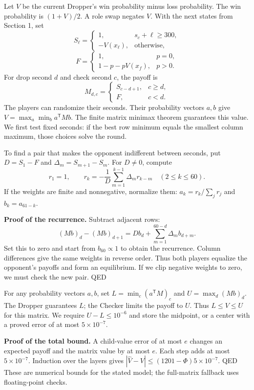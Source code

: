\documentclass[10pt]{article}
\newcommand{\head}[1]{\par\vspace{5pt}{\large\bfseries #1}\par\vspace{2pt}}
\begin{document}
\begin{minipage}[t]{0.505\textwidth}
\vspace{0pt}
\head{4. Calculate both players' strategies}
Let $V$ be the current Dropper's win probability minus loss probability.
The win probability is $(1+V)/2$. A role swap negates $V$. With the next states from Section 1, set
\[
S_\ell=\begin{cases}1,&s_c+\ell\ge300,\\-V(x_\ell),&\text{otherwise},\end{cases}
\]
\[
F=\begin{cases}1,&p=0,\\1-p-pV(x_f),&p>0.\end{cases}
\]
For drop second $d$ and check second $c$, the payoff is
\[
M_{d,c}=\begin{cases}S_{c-d+1},&c\ge d,\\F,&c<d.\end{cases}
\]
The players can randomize their seconds. Their probability vectors
$a,b$ give $V=\max_a\min_b a^{\mathsf T}Mb$.
The finite matrix minimax theorem guarantees this value.
We first test fixed seconds: if the best row minimum equals the smallest column maximum, those choices solve the round.

To find a pair that makes the opponent indifferent between seconds,
put $D=S_1-F$ and $\Delta_m=S_{m+1}-S_m$. For $D\ne0$, compute
\[
\boxed{r_1=1,\qquad r_k=-\frac{1}{D}\sum_{m=1}^{k-1}\Delta_m r_{k-m}
\quad(2\le k\le60).}
\]
If the weights are finite and nonnegative, normalize them:
$a_k=r_k/\sum_j r_j$ and $b_k=a_{61-k}$.

\textbf{Proof of the recurrence.} Subtract adjacent rows:
\[
(Mb)_d-(Mb)_{d+1}=D b_d+\sum_{m=1}^{60-d}\Delta_m b_{d+m}.
\]
Set this to zero and start from $b_{60}\propto1$ to obtain the recurrence.
Column differences give the same weights in reverse order.
Thus both players equalize the opponent's payoffs and form an equilibrium.
If we clip negative weights to zero, we must check the new pair. \textup{QED}

\head{5. Check the error}
For any probability vectors $a,b$, set
$L=\min_c(a^{\mathsf T}M)_c$ and $U=\max_d(Mb)_d$.
The Dropper guarantees $L$; the Checker limits the payoff to $U$.
Thus $L\le V\le U$ for this matrix.
We require $U-L\le10^{-6}$ and store the midpoint, or a center
with a proved error of at most $5\times10^{-7}$.

\textbf{Proof of the total bound.} A child-value error of at most $e$
changes an expected payoff and the matrix value by at most $e$.
Each step adds at most $5\times10^{-7}$.
Induction over the layers gives
$|\widehat V-V|\le(1201-\Phi)5\times10^{-7}$. \textup{QED}
These are numerical bounds for the stated model; the full-matrix
fallback uses floating-point checks.
\end{minipage}\hfill
\end{document}
